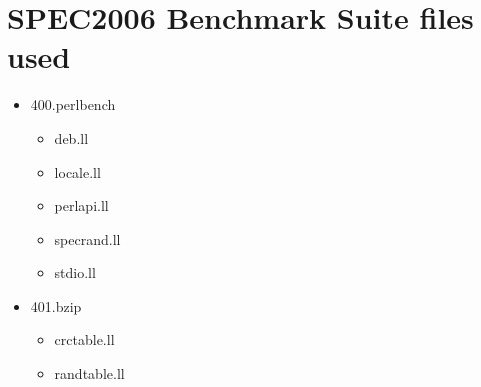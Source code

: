 
\clearpage
\section{SPEC2006 Benchmark Suite files used}
\label{app:SPEC2006_files_used}

\begin{multicols}{3}
\begin{itemize}
	\item 400.perlbench
	\begin{itemize}
		\item deb.ll
		\item locale.ll
		\item perlapi.ll
		\item specrand.ll
		\item stdio.ll
	\end{itemize}

	\item 401.bzip
	\begin{itemize}
		\item crctable.ll
		\item randtable.ll
	\end{itemize}


\end{itemize}
\end{multicols}

